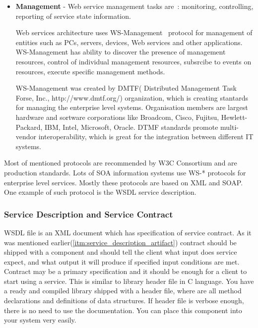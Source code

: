 \begin{itemize}
Web services architecture uses WS-Security\footnote{WS-Security (Web Services
Security, short WSS) is an extension to SOAP to apply security to web services.
It is a member of the WS-* family of web service specifications and was
published by OASIS(Organization for the Advancement of Structured Information
Standards, https://www.oasis-open.org/). \cite{wikipedia:WS-Security}}
~protocol to solve security problems.
This protocol specifies how \gls{SOAP} messages may be secured.
 


\item \textbf{Management} -
Web service management tasks are~\cite{ws_arch}: monitoring, controlling,
reporting of service state information. 

Web services architecture uses WS-Management~\cite{ws_security_promo} protocol
for management of entities such as PCs, servers, devices, Web services and other
applications. WS-Management has ability to discover the presence of management resources,
control of individual management resources, subsrcibe to events on resources,
execute specific management methods.

WS-Management was created by DMTF( Distributed Management Task Forse, Inc.,
http://www.dmtf.org/) organization, which is creating stantards for managing
the enterprise level systems. Organisation members are largest hardware and
sortware corporations like Broadcom, Cisco, Fujitsu, Hewlett-Packard, IBM, Intel,
Microsoft, Oracle. DTMF standards promote multi-vendor interoperability, which
is great for the integration between different IT systems. 

\end{itemize}

Most of mentioned protocols are recommended by W3C Consortium and are production
standards. Lots of \gls{SOA} information systems use WS-* protocols for
enterprise level services. Mostly these protocols are based on \gls{XML} and
\gls{SOAP}. One example of such protocol is the \gls{WSDL} service description.

\subsubsection{Service Description and Service Contract}
\label{sec:ws_service_contract}
\gls{WSDL} file is an \gls{XML} document which has specification of  service contract.
As it was mentioned earlier(\autoref{itm:service_description_artifact}) contract should be shipped with a component and should  tell the
client what input does service expect, and what output it will produce if specified input conditions are met. 
Contract may be a primary specification and it should be enough for a client to start using a service.
This is similar to library header file in C language. 
You have a ready and compiled library shipped with a header file, where are all
method declarations and definitions of data structures.
If header file is verbose enough, there is no need to use the documentation. You can place this component into your system very easily.




